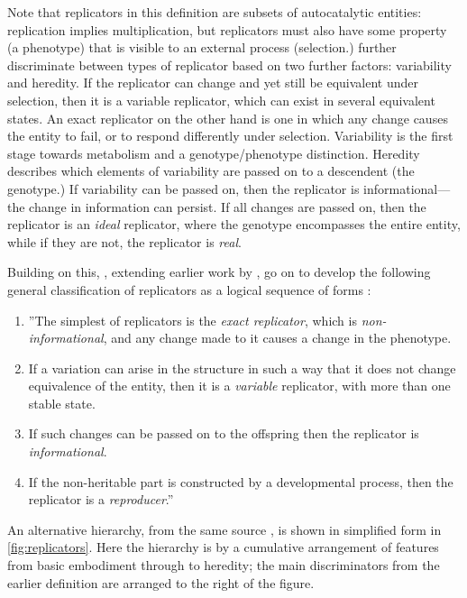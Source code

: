 Note that replicators in this definition are subsets of autocatalytic entities: replication implies multiplication, but replicators must also have some property (a phenotype) that is visible to an external process (selection.)  further discriminate between types of replicator based on two further factors: variability and heredity. If the replicator can change and yet still be equivalent under selection, then it is a variable replicator, which can exist in several equivalent states. An exact replicator on the other hand is one in which any change causes the entity to fail, or to respond differently under selection. Variability is the first stage towards metabolism and a genotype/phenotype distinction. Heredity describes which elements of variability are passed on to a descendent (the genotype.) If variability can be passed on, then the replicator is informational---the change in information can persist. If all changes are passed on, then the replicator is an \emph{ideal} replicator, where the genotype encompasses the entire entity, while if they are not, the replicator is \emph{real}.

Building on this, \citeauthor{Zachar2010}, extending earlier work by \textcite{Szathmary1999,Szathmary:2006ty}, go on to develop the following general classification of replicators as a logical sequence of forms \parencite[p.21, line breaks and numbering added for emphasis]{Zachar2010}:  

\begin{enumerate}
	\item ''The simplest of replicators is the \emph{exact replicator}, which is \emph{non-informational}, and any change made to it causes a change in the phenotype. 
	\item If a variation can arise in the structure in such a way that it does not change equivalence of the entity, then it is a \emph{variable} replicator, with more than one stable state.
	\item If such changes can be passed on to the offspring then the replicator is \emph{informational}. 
	\item If the non-heritable part is constructed by a developmental process, then the replicator is a \emph{reproducer}.'' 
\end{enumerate}

An alternative hierarchy, from the same source \parencite{Zachar2010}, is shown in simplified form in \cref{fig:replicators}. Here the hierarchy is by a cumulative arrangement of features from basic embodiment through to heredity; the main discriminators from the earlier definition are arranged to the right of the figure.

